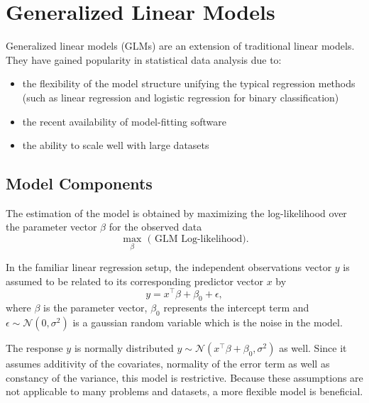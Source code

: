 
\section{Generalized Linear Models}

Generalized linear models (GLMs) are an extension of traditional linear models. They have gained popularity in statistical data analysis due to: 
\begin{itemize}
\item the flexibility of the model structure unifying the typical regression methods (such as linear regression and logistic regression for binary classification)
\item the recent availability of model-fitting software
\item the ability to scale well with large datasets
\end{itemize}

\subsection{Model Components}

The estimation of the model is obtained by maximizing the log-likelihood over the parameter vector $\beta$ for the observed data
 $$\max_{\beta} \mbox{ ( GLM Log-likelihood)}.$$


In the familiar linear regression setup, the independent observations vector $y$ is assumed to be related to its corresponding predictor vector $x$ by $$y = x^{\top}\beta + \beta_0 + \epsilon,$$ where $\beta$ is the parameter vector, $\beta_0$ represents the intercept term and $\epsilon \sim \mathcal{N}( 0, \sigma^2 )$ is a gaussian random variable which is the noise in the model. 

The response $y$ is normally distributed $y \sim \mathcal{N}( x^{\top} \beta + \beta_0, \sigma^2 )$ as well. Since it assumes additivity of the covariates, normality of the error term as well as constancy of the variance, this model is restrictive. Because these assumptions are not applicable to many problems and datasets, a more flexible model is beneficial. 

